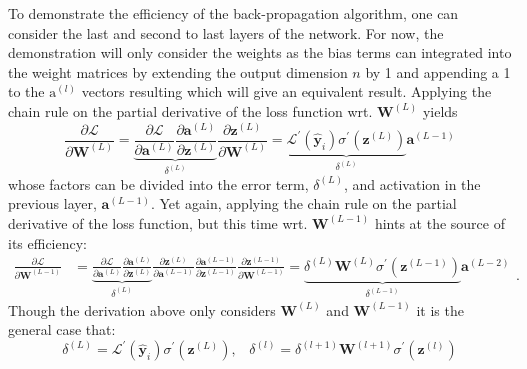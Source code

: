 \documentclass[a4paper,11pt]{article} %
\begin{document}
To demonstrate the efficiency of the back-propagation algorithm, one can consider the last and second to last layers of the network. For now, the demonstration will only consider the weights as the bias terms can integrated into the weight matrices by extending the output dimension $n$ by 1 and appending a 1 to the $\mathrm{a}^{(l)}$ vectors resulting which will give an equivalent result. Applying the chain rule on the partial derivative of the loss function wrt. $\mathbf{W}^{(L)}$ yields
\begin{equation} \label{eq:dLdW1}
  \frac{\partial \mathcal{L}}{\partial \mathbf{W}^{(L)}}  
= \underbrace{
    \frac{\partial \mathcal{L}}{\partial \mathbf{a}^{(L)}}
    \frac{\partial \mathbf{a}^{(L)}}{\partial \mathbf{z}^{(L)}}
  }_ {\delta^{(L)}}
  \frac{\partial \mathbf{z}^{(L)}}{\partial \mathbf{W}^{(L)}}
= \underbrace{
    \mathcal{L}^\prime (\hat{\mathbf{y}}_i) \sigma^\prime(\mathbf{z}^{(L)})
  }_{\delta^{(L)}}
 \mathbf{a}^{(L-1)}
\end{equation}
whose factors can be divided into the error term, $\delta^{(L)}$, and activation in the previous layer, $\mathbf{a}^{(L-1)}$. Yet again, applying the chain rule on the partial derivative of the loss function, but this time wrt. $\mathbf{W}^{(L-1)}$ hints at the source of its efficiency:
\begin{equation}
\begin{split}
    \frac{\partial \mathcal{L}}{\partial \mathbf{W}^{(L-1)}}
 &= \underbrace{
   \frac{\partial \mathcal{L}}{\partial \mathbf{a}^{(L)}}
   \frac{\partial \mathbf{a}^{(L)}}{\partial \mathbf{z}^{(L)}}
 }_{\delta^{(L)}}
   \frac{\partial \mathbf{z}^{(L)}}{\partial \mathbf{a}^{(L-1)}}
   \frac{\partial \mathbf{a}^{(L-1)}}{\partial \mathbf{z}^{(L-1)}}
   \frac{\partial \mathbf{z}^{(L-1)}}{\partial \mathbf{W}^{(L-1)}}
  = \underbrace{
    \delta^{(L)}
    \mathbf{W}^{(L)}
    \sigma^\prime(\mathbf{z}^{(L-1)})
  }_{\delta^{(L-1)}}
  \mathbf{a}^{(L-2)}
\end{split}.
\end{equation}
Though the derivation above only considers $\mathbf{W}^{(L)}$ and $\mathbf{W}^{(L-1)}$ it is the general case that:
\begin{equation} \label{eq:delta-terms}
  \delta^{(L)} = \mathcal{L}^\prime (\hat{\mathbf{y}}_i) \sigma^\prime(\mathbf{z}^{(L)}), 
  \hspace{10pt}
  \delta^{(l)} =  \delta^{(l+1)}\mathbf{W}^{(l+1)}\sigma^\prime(\mathbf{z}^{(l)})
\end{equation}
\end{document}
